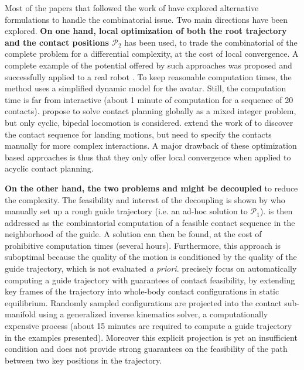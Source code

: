 Most of the papers that followed the work of \citeauthor{conf/iser/BretlRLKA04} have explored alternative formulations to handle the combinatorial issue. Two main directions have been explored. \textbf{On one hand, local optimization of both the root trajectory \Pa and the contact positions $\mathcal{P}_2$} has been used, to trade the combinatorial of the complete problem for a differential complexity, at the cost of local convergence. A complete example of the potential offered by such approaches was proposed \citep{Mordatch:2012:DCB:2185520.2185539} and successfully applied to a real robot \citep{mordatch2015}. To keep reasonable computation times, the method uses a simplified dynamic model for the avatar. Still, the computation time is far from interactive  (about 1 minute of computation for a sequence of 20 contacts). \citeauthor{DBLP:conf/humanoids/DeitsT14} propose to solve contact planning globally as a mixed integer problem, but only cyclic, bipedal locomotion is considered. 
\citeauthor{dai2014whole} extend the work of \citeauthor{Posa:2014:DMT:2568343.2568352} to discover the contact sequence for landing motions, but need to specify
the contacts manually for more complex interactions.
A major drawback of these optimization based approaches is thus that they only offer local convergence when applied to acyclic contact planning.

\textbf{On the other hand, the two problems \Pa and \Pb might be decoupled} to reduce the complexity. The feasibility and interest of the decoupling is shown by \citeauthor{DBLP:conf/iser/EscandeKMG08} who manually set up a rough guide trajectory (i.e. an ad-hoc solution to $\mathcal{P}_1$). \Pb  is then addressed as the combinatorial computation of a feasible contact sequence in the neighborhood of the guide. A solution can then be found, at the cost of prohibitive computation times (several hours). Furthermore, this approach is suboptimal because the quality of the motion is conditioned by the quality of the guide trajectory,  which is not evaluated \textit{a priori}. \citeauthor{Bouyarmane2009} precisely focus on automatically computing a guide trajectory with guarantees of contact feasibility, by extending key frames of the trajectory into whole-body contact configurations in static equilibrium. Randomly sampled configurations are projected into the contact sub-manifold using a generalized inverse kinematics solver, a computationally expensive process (about 15 minutes are required to compute a guide trajectory in the examples presented). Moreover this explicit projection is yet an insufficient condition and does not provide strong guarantees on the feasibility of the path between two key positions in the trajectory.

